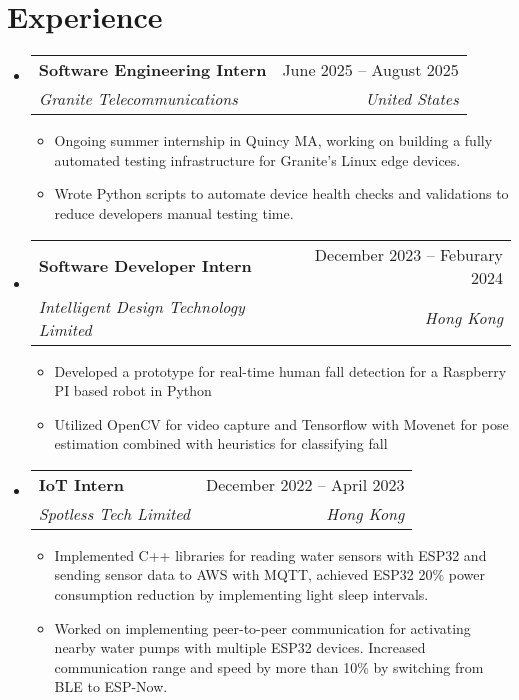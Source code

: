 \documentclass[letterpaper,11pt]{article}
\makeatletter
\newcommand{\resumeItem}[1]{
  \item\small{
    {#1 \vspace{-2pt}}
  }
}
\newcommand{\resumeSubheading}[4]{
  \vspace{-2pt}\item
    \begin{tabular*}{0.97\textwidth}[t]{l@{\extracolsep{\fill}}r}
      \textbf{#1} & #2 \\
      \textit{\small#3} & \textit{\small #4} \\
    \end{tabular*}\vspace{-7pt}
}
\newcommand{\resumeSubSubheading}[2]{
    \item
    \begin{tabular*}{0.97\textwidth}{l@{\extracolsep{\fill}}r}
      \textit{\small#1} & \textit{\small #2} \\
    \end{tabular*}\vspace{-7pt}
}
\newcommand{\resumeSubHeadingListStart}{\begin{itemize}[leftmargin=0.08in, label={}]}
\newcommand{\resumeSubHeadingListEnd}{\end{itemize}}
\newcommand{\resumeItemListStart}{\begin{itemize}[leftmargin=0.22in]}
\newcommand{\resumeItemListEnd}{\end{itemize}\vspace{-5pt}}
\makeatother
\begin{document}
\section{Experience}
  \resumeSubHeadingListStart

  \resumeSubheading
    {Software Engineering Intern}{June 2025 -- August 2025}
    {Granite Telecommunications}{United States}
    \resumeItemListStart
      \resumeItem{Ongoing summer internship in Quincy MA, working on building a fully automated testing infrastructure for Granite's Linux edge devices.}
      \resumeItem{Wrote Python scripts to automate device health checks and validations to reduce developers manual testing time.}
    \resumeItemListEnd

    \resumeSubheading
      {Software Developer Intern}{December 2023 -- Feburary 2024}
      {Intelligent Design Technology Limited}{Hong Kong}
      \resumeItemListStart
        \resumeItem{Developed a prototype for real-time human fall detection for a Raspberry PI based robot in Python}
        \resumeItem{Utilized OpenCV for video capture and Tensorflow with Movenet for pose estimation combined with heuristics for classifying fall}
      \resumeItemListEnd
      

    \resumeSubheading
      {IoT Intern}{December 2022 -- April 2023}
      {Spotless Tech Limited}{Hong Kong}
      \resumeItemListStart
        \resumeItem{Implemented C++ libraries for reading water sensors with ESP32 and sending sensor data to AWS with MQTT, achieved ESP32 20\% power consumption reduction by implementing light sleep intervals.}
        \resumeItem{Worked on implementing peer-to-peer communication for activating nearby water pumps with multiple ESP32 devices. Increased communication range and speed by more than 10\% by switching from BLE to ESP-Now.}
    \resumeItemListEnd

  \resumeSubHeadingListEnd

\end{document}
